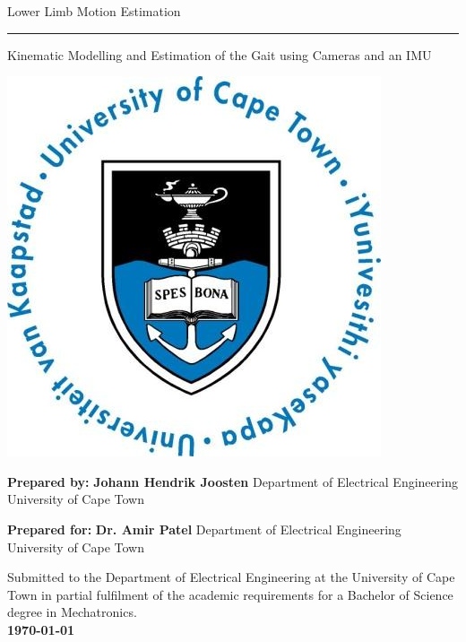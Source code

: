 \thispagestyle{empty}
{\Huge \begin{center}

Lower Limb Motion Estimation 
\vskip 3mm
\hrule 

\vskip 3mm
{\Large Kinematic Modelling and Estimation of the Gait using Cameras and an IMU}
\end{center}}

\vskip 3mm
\begin{center}
\includegraphics[scale = 0.35]{figures/uctLogo.png}
\end{center}

\vskip 3mm
\begin{center}
{\large
\textbf{Prepared by:}
\vskip 0.01mm
\textbf{\LARGE Johann Hendrik Joosten}
\vskip 0mm
Department of Electrical Engineering\\University of Cape Town
}
\end{center}

\vskip 3mm
\begin{center}
{\large
\textbf{Prepared for:}
\vskip 0.01mm
\textbf{\LARGE Dr. Amir Patel}
\vskip 0mm
Department of Electrical Engineering\\University of Cape Town
}
\end{center}


\vskip 5mm
\begin{center}
Submitted to the Department of Electrical Engineering at the University of Cape Town in partial
fulfilment of the academic requirements for a Bachelor of Science degree in Mechatronics.\\
{\bf \today}
\end{center}


